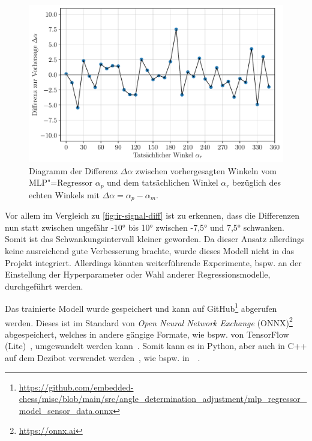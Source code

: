 {\begin{figure}[h]
    \centering
    \includegraphics[width=\textwidth]{../plot/angle_adjustment/mlp_sensor_diff.pdf}
    \caption{Diagramm der Differenz $\Delta\alpha$ zwischen vorhergesagten Winkeln vom MLP"=Regressor $\alpha_p$ und dem tatsächlichen Winkel $\alpha_r$ bezüglich des echten Winkels mit $\Delta\alpha = \alpha_p - \alpha_m$.}
    \label{fig:cnn-mlp-diff}
\end{figure}

Vor allem im Vergleich zu \autoref{fig:ir-signal-diff} ist zu erkennen, dass die Differenzen nun statt zwischen ungefähr -10° bis 10° zwischen -7,5° und 7,5° schwanken. Somit ist das Schwankungsintervall kleiner geworden. Da dieser Ansatz allerdings keine ausreichend gute Verbesserung brachte, wurde dieses Modell nicht in das Projekt integriert. Allerdings könnten weiterführende Experimente, bspw. an der Einstellung der Hyperparameter oder Wahl anderer Regressionsmodelle, durchgeführt werden.

Das trainierte Modell wurde gespeichert und kann auf GitHub\footnote{\url{https://github.com/embedded-chess/misc/blob/main/src/angle_determination_adjustment/mlp_regressor_model_sensor_data.onnx}} abgerufen werden. Dieses ist im Standard von \emph{Open Neural Network Exchange} (ONNX)\footnote{\url{https://onnx.ai}} abgespeichert, welches in andere gängige Formate, wie bspw. von TensorFlow (Lite)~\cite{hyodoToolsConvertONNX2025, internationalbusinessmachinescorporationOnnxOnnxtensorflow2022}, umgewandelt werden kann~\cite{scikit-learndevelopersModelPersistence2025}. Somit kann es in Python, aber auch in C++ auf dem Dezibot verwendet werden~\cite{espressifsystemsEspressifEsptflitemicro2025,thetensorflowauthorsTanakamasayukiArduino_TensorFlowLite_ESP322022}, wie bspw. in~\citeauthor{antonovSnskorpion2DezibotLabyrinthSolver2025}~\cite{antonovSnskorpion2DezibotLabyrinthSolver2025}.

}
